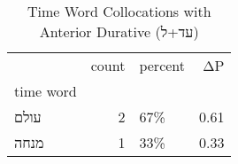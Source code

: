 \begin{table}[htbp!]
\centering
\caption{Time Word Collocations with Anterior Durative (עד+ל)}
\label{table:antdurעד+ל_head_cpd}
\begin{tabular}{lrlr}
\toprule
{} &  count & percent &    ΔP \\
time word &        &         &       \\
\midrule
עולם      &      2 &     67\% &  0.61 \\
מנחה      &      1 &     33\% &  0.33 \\
\bottomrule
\end{tabular}
\end{table}
